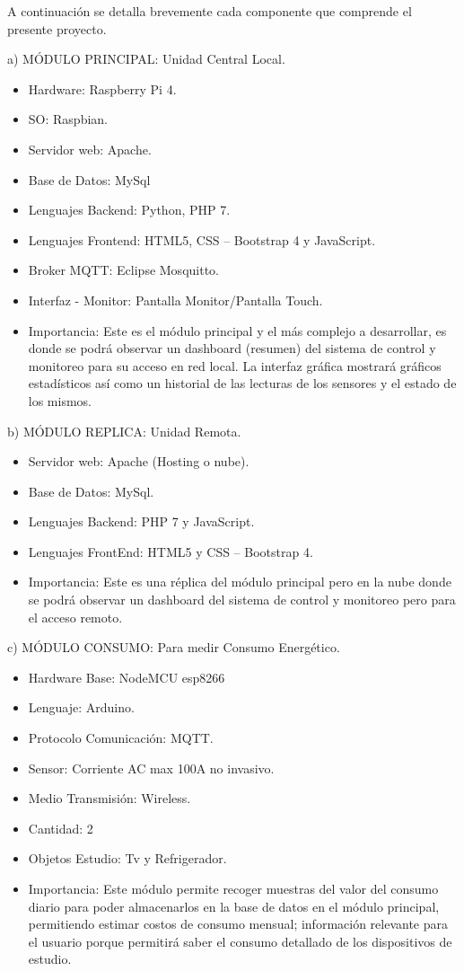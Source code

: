 \documentclass[11pt]{charter}
\begin{document}
A continuación se detalla brevemente cada componente que comprende el presente proyecto.

a) MÓDULO PRINCIPAL: Unidad Central Local.
\begin{itemize}
\item Hardware: Raspberry Pi 4.
\item SO: Raspbian.
\item Servidor web: Apache.
\item Base de Datos: MySql
\item Lenguajes Backend: Python, PHP 7.
\item Lenguajes Frontend: HTML5, CSS – Bootstrap 4 y JavaScript.
\item Broker MQTT: Eclipse Mosquitto.
\item Interfaz - Monitor: Pantalla Monitor/Pantalla Touch.
\item Importancia: Este es el módulo principal y el más complejo a desarrollar, es donde se podrá observar un dashboard (resumen) del sistema de control y monitoreo para su acceso en red local. La interfaz gráfica mostrará gráficos estadísticos así como un historial de las lecturas de los sensores y el estado de los mismos.
\end{itemize}

b) MÓDULO REPLICA: Unidad Remota.
\begin{itemize}
\item Servidor web: Apache (Hosting o nube).
\item Base de Datos: MySql.
\item Lenguajes Backend: PHP 7 y JavaScript.
\item Lenguajes FrontEnd: HTML5 y CSS – Bootstrap 4.
\item Importancia: Este es una réplica del módulo principal pero en la nube donde se podrá observar un dashboard del sistema de control y monitoreo pero para el acceso remoto.
\end{itemize}


c) MÓDULO CONSUMO: Para medir Consumo Energético.
\begin{itemize}
\item Hardware Base: NodeMCU esp8266
\item Lenguaje: Arduino.
\item Protocolo Comunicación: MQTT.
\item Sensor: Corriente AC max 100A no invasivo.
\item Medio Transmisión: Wireless.
\item Cantidad: 2
\item Objetos Estudio: Tv y Refrigerador.
\item Importancia: Este módulo permite recoger muestras del valor del consumo diario para poder almacenarlos en la base de datos en el módulo principal, permitiendo estimar costos de consumo mensual; información relevante para el usuario porque permitirá saber el consumo detallado de los dispositivos de estudio.
\end{itemize}
\end{document}
